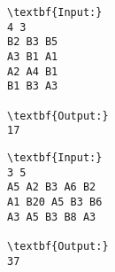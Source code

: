 \begin{verbatim}
\textbf{Input:}
4 3
B2 B3 B5
A3 B1 A1
A2 A4 B1
B1 B3 A3

\textbf{Output:}
17
\end{verbatim}
\begin{verbatim}
\textbf{Input:}
3 5
A5 A2 B3 A6 B2
A1 B20 A5 B3 B6
A3 A5 B3 B8 A3

\textbf{Output:}
37\end{verbatim}